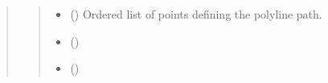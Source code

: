 \documentclass[letterpaper,10pt,english]{sphinxmanual}
\begin{document}
\begin{quote}
\begin{fulllineitems}
\begin{fulllineitems}
\begin{quote}
\begin{description}
\begin{itemize}
\item {} 
\sphinxAtStartPar
{} (\sphinxstyleliteralemphasis{\sphinxupquote{{[}}}\sphinxstyleliteralemphasis{\sphinxupquote{{]}}}) \textendash{} Ordered list of points defining the polyline path.

\item {} 
\sphinxAtStartPar
{} (\sphinxstyleliteralemphasis{\sphinxupquote{ | }}\sphinxstyleliteralemphasis{\sphinxupquote{ | }}\sphinxstyleliteralemphasis{\sphinxupquote{ | }}\sphinxstyleliteralemphasis{\sphinxupquote{ | }})

\item {} 
\sphinxAtStartPar
{} (\sphinxstyleliteralemphasis{\sphinxupquote{{[}}}\sphinxstyleliteralemphasis{\sphinxupquote{ | }}\sphinxstyleliteralemphasis{\sphinxupquote{ | }}\sphinxstyleliteralemphasis{\sphinxupquote{ | }}\sphinxstyleliteralemphasis{\sphinxupquote{{]} }}\sphinxstyleliteralemphasis{\sphinxupquote{| }})

\end{itemize}

\end{description}\end{quote}

\end{fulllineitems}



\end{fulllineitems}
\end{quote}
\end{document}
